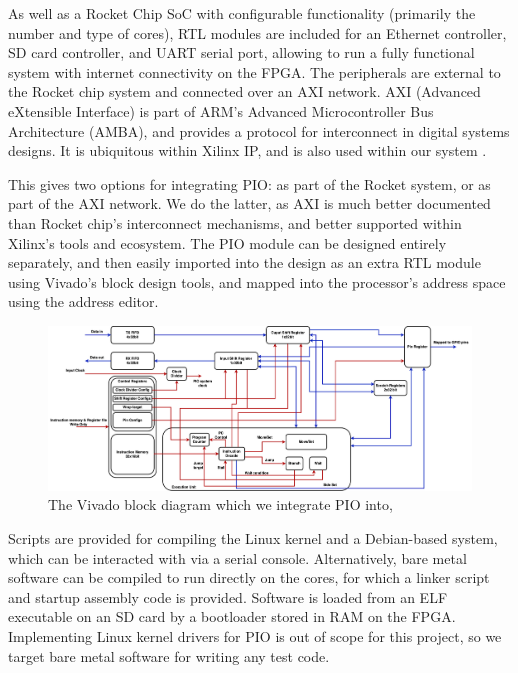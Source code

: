 As well as a Rocket Chip SoC with configurable functionality (primarily the number and type of cores), RTL modules are included for an Ethernet controller, SD card controller, and UART serial port, allowing to run a fully functional system with internet connectivity on the FPGA. The peripherals are external to the Rocket chip system and connected over an AXI network. AXI (Advanced eXtensible Interface) is part of ARM's Advanced Microcontroller Bus Architecture (AMBA), and provides a protocol for interconnect in digital systems designs. It is ubiquitous within Xilinx IP, and is also used within our system \cite{axi}.

This gives two options for integrating PIO: as part of the Rocket system, or as part of the AXI network. We do the latter, as AXI is much better documented than Rocket chip's interconnect mechanisms, and better supported within Xilinx's tools and ecosystem. The PIO module can be designed entirely separately, and then easily imported into the design as an extra RTL module using Vivado's block design tools, and mapped into the processor's address space using the address editor.

\begin{figure}[H]
    \centering
    \includegraphics[width=1.1\textwidth]{../img/bd.png}
    \caption{The Vivado block diagram which we integrate PIO into,}
    \label{fig:vivado-bd}
\end{figure}

Scripts are provided for compiling the Linux kernel and a Debian-based system, which can be interacted with via a serial console. Alternatively, bare metal software can be compiled to run directly on the cores, for which a linker script and startup assembly code is provided. Software is loaded from an ELF executable on an SD card by a bootloader stored in RAM on the FPGA. Implementing Linux kernel drivers for PIO is out of scope for this project, so we target bare metal software for writing any test code.




